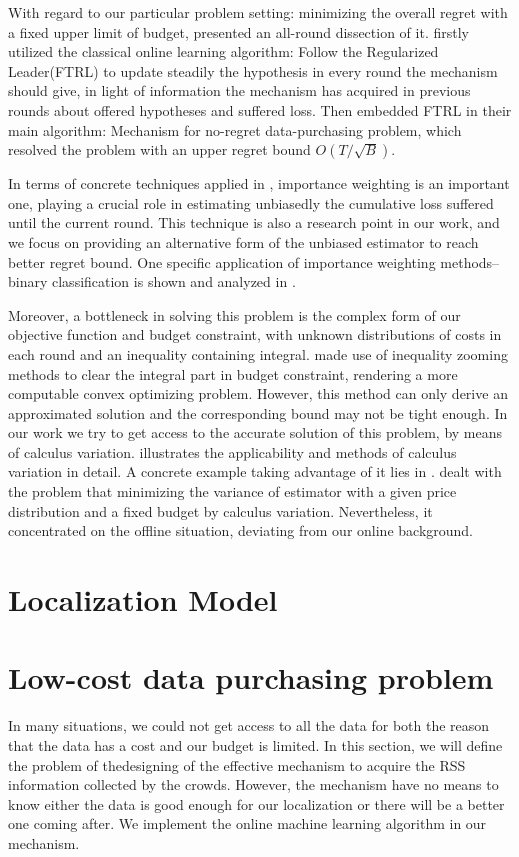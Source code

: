 \documentclass[10pt,conference,compsocconf,letterpaper]{IEEEtran}
\begin{document}
With regard to our particular problem setting: minimizing the overall regret with a fixed upper limit of budget,\cite{low-cost} presented an all-round dissection of it. \cite{low-cost} firstly utilized the classical online learning algorithm: Follow the Regularized Leader(FTRL) to update steadily the hypothesis in every round the mechanism should give, in light of information the mechanism has acquired in previous rounds about offered hypotheses and suffered loss. Then \cite{low-cost} embedded FTRL in their main algorithm: Mechanism for no-regret data-purchasing problem, which resolved the problem with an upper regret bound $O(T/\sqrt{B})$.

In terms of concrete techniques applied in \cite{low-cost}, importance weighting is an important one, playing a crucial role in estimating unbiasedly the cumulative loss suffered until the current round. This technique is also a research point in our work, and we focus on providing an alternative form of the unbiased estimator to reach better regret bound. One specific application of importance weighting methods--binary classification is shown and analyzed in \cite{importance weight}.

Moreover, a bottleneck in solving this problem is the complex form of our objective function and budget constraint, with unknown distributions of costs in each round and an inequality containing integral. \cite{low-cost} made use of inequality zooming methods to clear the integral part in budget constraint, rendering a more computable convex optimizing problem. However, this method can only derive an approximated solution and the corresponding bound may not be tight enough. In our work we try to get access to the accurate solution of this problem, by means of calculus variation. \cite{calculus-variation} illustrates the applicability and methods of calculus variation in detail. A concrete example taking advantage of it lies in \cite{conduct truthful survey}. \cite{conduct truthful survey} dealt with the problem that minimizing the variance of estimator with a given price distribution and a fixed budget by calculus variation. Nevertheless, it concentrated on the offline situation, deviating from our online background.



\section{Localization Model}

\section{Low-cost data purchasing problem}
 In many situations, we could not get access to all the data for both the reason that the data has a cost and our budget is limited. In this section, we will define the problem of thedesigning of the effective mechanism to acquire the RSS information collected by the crowds. However, the mechanism have no means to know either the data is good enough for our localization or there will be a better one coming after. We implement the online machine learning algorithm in our mechanism.
\end{document}

